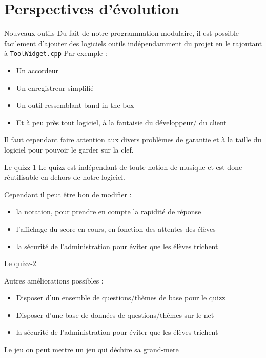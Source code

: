 \section{Perspectives d'évolution}

\begin{frame}
  \tableofcontents[currentsection]
\end{frame}
\begin{frame}{Nouveaux outils}
  Du fait de notre programmation modulaire, il est possible facilement d'ajouter des logiciels outils indépendamment du projet en le rajoutant à \texttt{ToolWidget.cpp}
  Par exemple : \\
  \begin{itemize}
  \item Un accordeur
  \item Un enregistreur simplifié
  \item Un outil ressemblant band-in-the-box
  \item Et à peu près tout logiciel, à la fantaisie du développeur/ du client
  \end{itemize}
  
  Il faut cependant faire attention aux divers problèmes de garantie et à la taille du logiciel pour pouvoir le garder sur la clef.
\end{frame}

\begin{frame}{Le quizz-1}
Le quizz est indépendant de toute notion de musique et est donc réutilisable en dehors de notre logiciel.\\
\begin{block}{Cependant il peut être bon de modifier :}
  \begin{itemize}
  \item la notation, pour prendre en compte la rapidité de réponse
  \item l'affichage du score en cours, en fonction des attentes des élèves
  \item la sécurité de l'administration pour éviter que les élèves trichent
  \end{itemize}
\end{block}
\end{frame}
\begin{frame}{Le quizz-2}
\begin{block}{Autres améliorations possibles : }
  \begin{itemize}
  \item Disposer d'un ensemble de questions/thèmes de base pour le quizz
  \item Disposer d'une base de données de questions/thèmes sur le net
  \item la sécurité de l'administration pour éviter que les élèves trichent
  \end{itemize}  
\end{block}
\end{frame}

\begin{frame}{Le jeu}
  on peut mettre un jeu qui déchire sa grand-mere
\end{frame}

%